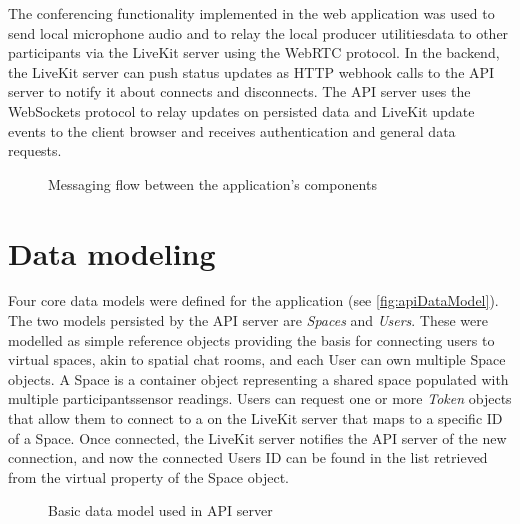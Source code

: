The conferencing functionality implemented in the web application was used to send local microphone audio and to relay the local producer utilities\textquotesingle data to other participants via the LiveKit server using the WebRTC protocol.
In the backend, the LiveKit server can push status updates as \ac{HTTP} webhook calls to the \ac{API} server to notify it about connects and disconnects.
The \ac{API} server uses the WebSockets protocol to relay updates on persisted data and LiveKit update events to the client browser and receives authentication and general data requests.

\begin{figure}[!ht]
\centering

\caption[Application messaging flow]{Messaging flow between the application's components\protect}
\label{fig:messagingFlow}
\end{figure}

\section{Data modeling}
\label{sec:datamodeling}

Four core data models were defined for the application (see \autoref{fig:apiDataModel}).
The two models persisted by the \ac{API} server are \emph{Spaces} and \emph{Users}.
These were modelled as simple reference objects providing the basis for connecting users to virtual spaces, akin to spatial chat rooms, and each User can own multiple Space objects.
A Space is a container object representing a shared space populated with multiple participants\textquotesingle sensor readings.
Users can request one or more \emph{Token} objects that allow them to connect to a  on the LiveKit server that maps to a specific ID of a Space.
Once connected, the LiveKit server notifies the \ac{API} server of the new connection, and now the connected User\textquotesingle s ID can be found in the list retrieved from the virtual  property of the Space object.

\begin{figure}[!ht]
\centering

\caption[API data model]{Basic data model used in API server\protect}
\label{fig:apiDataModel}
\end{figure}

